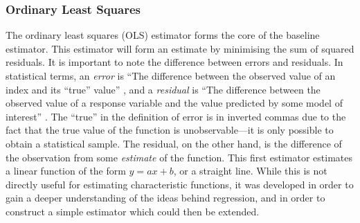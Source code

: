 \documentclass[a4paper,11pt]{article}
\begin{document}
\subsubsection{Ordinary Least Squares}
\label{sec-6-1-1}

The ordinary least squares (OLS) estimator forms the core of the baseline
estimator. This estimator will form an estimate by minimising the sum of squared
residuals. It is important to note the difference between errors and
residuals. In statistical terms, an \emph{error} is ``The difference between the
observed value of an index and its ``true'' value'' \cite{2008oecd}, and a
\emph{residual} is ``The difference between the observed value of a response
variable and the value predicted by some model of interest''
\cite{everitt2010cambridge}. The ``true'' in the definition of error is in
inverted commas due to the fact that the true value of the function is
unobservable---it is only possible to obtain a statistical sample. The residual,
on the other hand, is the difference of the observation from some
\emph{estimate} of the function. This first estimator estimates a linear
function of the form $y=ax+b$, or a straight line. While this is not directly
useful for estimating characteristic functions, it was developed in order to
gain a deeper understanding of the ideas behind regression, and in order to
construct a simple estimator which could then be extended.
\end{document}
